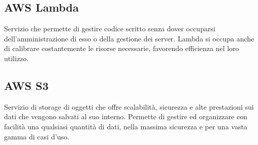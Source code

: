 \subsection*{AWS Lambda}
Servizio  che permette di gestire codice scritto senza dover occuparsi dell'amministrazione di esso o della gestione dei server. Lambda si occupa anche di calibrare costantemente le risorse necessarie, favorendo efficienza nel loro utilizzo. 

\subsection*{AWS S3}
Servizio  di storage di oggetti che offre scalabilità, sicurezza e alte prestazioni sui dati che vengono salvati al suo interno. Permette di gestire ed organizzare con facilità una qualsiasi quantità di dati, nella massima sicurezza e per una vasta gamma di casi d'uso.
